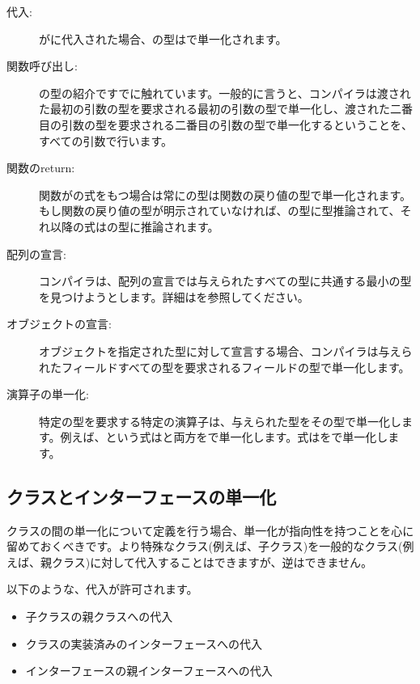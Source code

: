 \begin{description}
	\item[代入:] がに代入された場合、の型はで単一化されます。
	\item[関数呼び出し:] の型の紹介ですでに触れています。一般的に言うと、コンパイラは渡された最初の引数の型を要求される最初の引数の型で単一化し、渡された二番目の引数の型を要求される二番目の引数の型で単一化するということを、すべての引数で行います。
	\item[関数のreturn:] 関数がの式をもつ場合は常にの型は関数の戻り値の型で単一化されます。もし関数の戻り値の型が明示されていなければ、の型に型推論されて、それ以降の式はの型に推論されます。
	\item[配列の宣言:] コンパイラは、配列の宣言では与えられたすべての型に共通する最小の型を見つけようとします。詳細はを参照してください。
	\item[オブジェクトの宣言:] オブジェクトを指定された型に対して宣言する場合、コンパイラは与えられたフィールドすべての型を要求されるフィールドの型で単一化します。
	\item[演算子の単一化:] 特定の型を要求する特定の演算子は、与えられた型をその型で単一化します。例えば、という式はと両方をで単一化します。式はをで単一化します。
\end{description}


\subsection{クラスとインターフェースの単一化}
\label{type-system-unification-between-classes-and-interfaces}

クラスの間の単一化について定義を行う場合、単一化が指向性を持つことを心に留めておくべきです。より特殊なクラス(例えば、子クラス)を一般的なクラス(例えば、親クラス)に対して代入することはできますが、逆はできません。

以下のような、代入が許可されます。

\begin{itemize}
	\item 子クラスの親クラスへの代入
	\item クラスの実装済みのインターフェースへの代入
	\item インターフェースの親インターフェースへの代入
\end{itemize}

